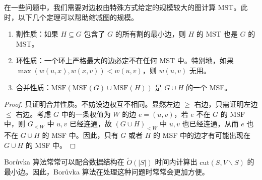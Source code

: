 在一些问题中，我们需要对边权由特殊方式给定的规模较大的图计算 MST。此时，以下几个定理可以帮助缩减图的规模。
\begin{theorem}
    \begin{enumerate}
        \item 割性质：如果 $H\subseteq G$ 包含了 $G$ 的所有割的最小边，则 $H$ 的 MST 也是 $G$ 的 MST。
        \item 环性质：一个环上严格最大的边必定不在任何 MST 中。特别地，如果 $\max(w(u,x),w(x,v))<w(u,v)$，则 $w(u,v)$ 无用。
        \item 合并性质：$\mathrm{MSF}(\mathrm{MSF}(G) \cup \mathrm{MSF}(H))$ 是 $G\cup H$ 的一个 MSF。
    \end{enumerate}
\end{theorem}
\begin{proof}
    只证明合并性质。不妨设边权互不相同。显然左边 $\ge$ 右边，只需证明左边 $\le$ 右边。考虑 $G$ 中的一条权值为 $W$ 的边 $e=(u,v)$，若 $e$ 不在 $G$ 的 MSF 中，则 $G_{<W}$ 中 $u,v$ 已经连通，故 $(G\cup H)_{<W}$ 中 $u,v$ 也已经连通，从而 $e$ 也不在 $G\cup H$ 的 MSF 中。因此，只有 $G$ 或者 $H$ 的 MSF 中的边才有可能出现在 $G\cup H$ 的 MSF 中。    
\end{proof}

Borůvka 算法常常可以配合数据结构在 $\tilde O(|S|)$ 时间内计算出 $\mathrm{cut}(S,V\backslash S)$ 的最小边。因此，Borůvka 算法在处理这种问题时常常会更加方便。

